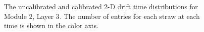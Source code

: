 \documentclass[a4paper]{report}
\numberwithin{equation}{section}
\begin{document}
\begin{figure}[htb!]
	\centering
	\quad
	\centering
	\caption{The uncalibrated and calibrated 2-D drift time 
	distributions for Module 2, Layer 3. The number of entries for each straw at each time is shown in the 
	color axis.}
	\label{fig:calib_drift2d_m2l3}
\end{figure}
\end{document}
